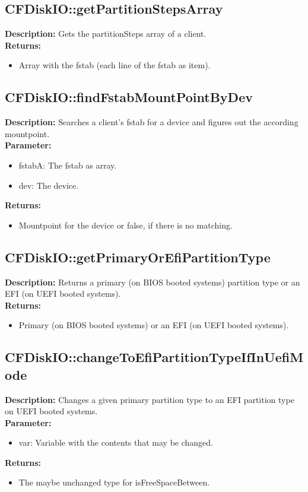 \subsection{CFDiskIO::getPartitionStepsArray}
\textbf{Description:} Gets the partitionSteps array of a client.\\
\textbf{Returns:}
\begin{itemize}
\item Array with the fstab (each line of the fstab as item).
\end{itemize}

\subsection{CFDiskIO::findFstabMountPointByDev}
\textbf{Description:} Searches a client's fstab for a device and figures out the according mountpoint.\\
\textbf{Parameter:}
\begin{itemize}
\item fstabA: The fstab as array.
\item dev: The device.
\end{itemize}
\textbf{Returns:}
\begin{itemize}
\item Mountpoint for the device or false, if there is no matching.
\end{itemize}

\subsection{CFDiskIO::getPrimaryOrEfiPartitionType}
\textbf{Description:} Returns a primary (on BIOS booted systems) partition type or an EFI (on UEFI booted systems).\\
\textbf{Returns:}
\begin{itemize}
\item Primary (on BIOS booted systems) or an EFI (on UEFI booted systems).
\end{itemize}

\subsection{CFDiskIO::changeToEfiPartitionTypeIfInUefiMode}
\textbf{Description:} Changes a given primary partition type to an EFI partition type on UEFI booted systems.\\
\textbf{Parameter:}
\begin{itemize}
\item var: Variable with the contents that may be changed.
\end{itemize}
\textbf{Returns:}
\begin{itemize}
\item The maybe unchanged type for isFreeSpaceBetween.
\end{itemize}

